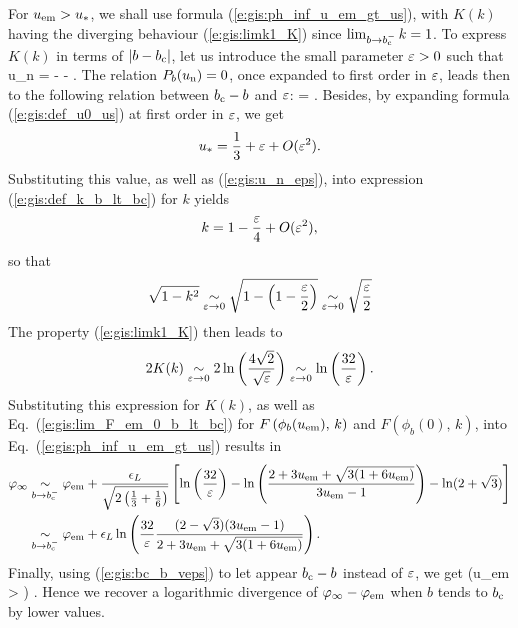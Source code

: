 For $u_{\rm em} > u_*$, we shall use formula (\ref{e:gis:ph_inf_u_em_gt_us}), with
$K(k)$ having the diverging behaviour (\ref{e:gis:limk1_K})
since $\lim_{b\to b_{\rm c}^-} k = 1$. To express $K(k)$ in terms of
$|b - b_{\rm c}|$, let us introduce the small parameter $\varepsilon > 0$ such that
\be \label{e:gis:u_n_eps}
    u_{\rm n} = -  - \veps.
\ee
The relation $P_b(u_{\rm n}) = 0$, once expanded to first order in $\varepsilon$,
leads then to the following relation between $b_{\rm c} - b$ and $\varepsilon$:
\be \label{e:gis:bc_b_veps}
     =  \veps.
\ee
Besides, by expanding formula (\ref{e:gis:def_u0_us}) at first order in $\varepsilon$,
we get
\[
    u_* = \frac{1}{3} + \varepsilon + O(\varepsilon^2) .
\]
Substituting this value, as well as (\ref{e:gis:u_n_eps}), into expression
(\ref{e:gis:def_k_b_lt_bc}) for $k$ yields
\[
    k = 1 - \frac{\varepsilon}{4} + O(\varepsilon^2) ,
\]
so that
\[
    \sqrt{1 - k^2} \underset{\varepsilon\to 0}{\sim} \sqrt{1 - \left(1 - \frac{\varepsilon}{2}\right)}
     \underset{\varepsilon\to 0}{\sim} \sqrt{\frac{\varepsilon}{2}}
\]
The property (\ref{e:gis:limk1_K}) then leads to
\[
    2 K(k) \underset{\varepsilon\to 0}{\sim} 2 \ln\left(\frac{4\sqrt{2}}{\sqrt{\varepsilon}}\right)
       \underset{\varepsilon\to 0}{\sim} \ln\left(\frac{32}{\varepsilon}\right)  .
\]
Substituting this expression for $K(k)$, as well as Eq.~(\ref{e:gis:lim_F_em_0_b_lt_bc})
for $F \left( \phi_b(u_{\rm em}),\, k \right)$ and $F \left( \phi_b(0),\, k \right)$,
into Eq.~(\ref{e:gis:ph_inf_u_em_gt_us}) results in
\begin{align}
\varphi_\infty & \underset{b\to b_{\rm c}^-}{\sim} \varphi_{\rm em}
    + \frac{\epsilon_L}{\sqrt{2\left(\frac{1}{3} + \frac{1}{6}\right)}} \left[
  \ln\left(\frac{32}{\varepsilon}\right)
    -  \ln \left(
      \frac{2 + 3 u_{\rm em} + \sqrt{3(1+6 u_{\rm em})}}{3 u_{\rm em} - 1}
      \right)
    - \ln(2 + \sqrt{3}) \right] \nonumber \\
 & \underset{b\to b_{\rm c}^-}{\sim} \varphi_{\rm em}
 + \epsilon_L \ln \left( \frac{32}{\varepsilon}
 \frac{(2 - \sqrt{3})(3 u_{\rm em} - 1)}{2 + 3 u_{\rm em} + \sqrt{3(1 + 6 u_{\rm em})}}
 \right) . \nonumber
\end{align}
Finally, using (\ref{e:gis:bc_b_veps}) to let appear $b_{\rm c} - b$
instead of $\varepsilon$, we get
\be \label{e:gis:ph_inf_lim_b_lt_bc_u_gt_us}
  \qquad \left(u_{\rm em} >  \right) .
\ee
Hence we recover a logarithmic divergence of $\varphi_\infty - \varphi_{\rm em}$
when $b$ tends to $b_{\rm c}$ by lower values.

